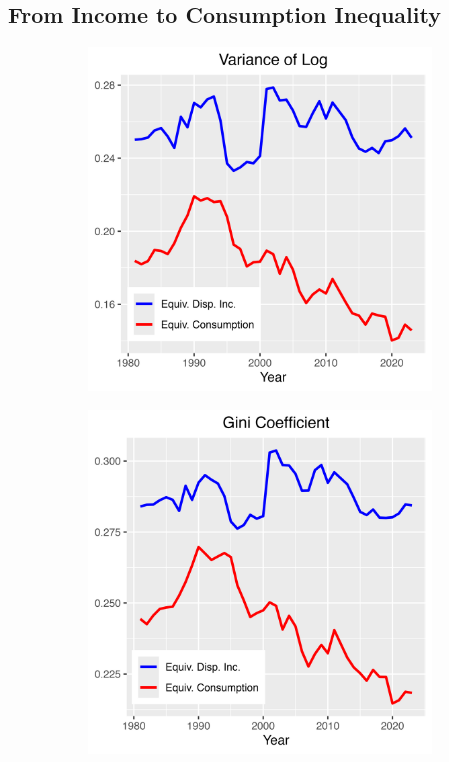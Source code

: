 \documentclass{article}
\begin{document}
\subsection{From Income to Consumption Inequality}

\begin{figure}
    \centering
    \begin{subfigure}[t]{0.475\textwidth}
        \centering
        \includegraphics[width=\textwidth]{Fig_6/Fig_6a.png}
        \label{fig:Consumption_Var}
    \end{subfigure}
    \begin{subfigure}[t]{0.475\textwidth}
        \centering
        \includegraphics[width=\textwidth]{Fig_6/Fig_6b.png}

\end{subfigure}
\end{figure}
\end{document}
